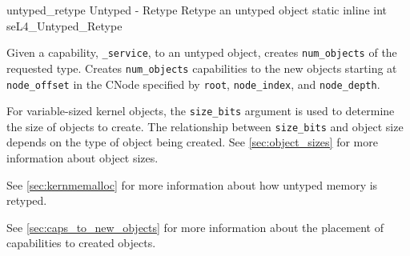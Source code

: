 %
%
%
%

\apidoc
{untyped_retype}
{Untyped - Retype}
{Retype an untyped object}
{static inline int seL4\_Untyped\_Retype}
{
}
{\errorenumdesc}
{
Given a capability, \texttt{\_service}, to an untyped object,
creates \texttt{num\_objects} of the requested type. Creates
\texttt{num\_objects} capabilities to the new objects starting
at \texttt{node\_offset} in the CNode specified by \texttt{root},
\texttt{node\_index}, and \texttt{node\_depth}.

For variable-sized
kernel objects, the \texttt{size\_bits} argument is used to
determine the size of objects to create. The relationship between
\texttt{size\_bits} and object size depends on the type of object
being created. See \autoref{sec:object_sizes} for more information
about object sizes.

See \autoref{sec:kernmemalloc} for more information about how untyped
memory is retyped.

See \autoref{sec:caps_to_new_objects} for more information about the
placement of capabilities to created objects.
}
\label{sec:api-untyped-retype}

